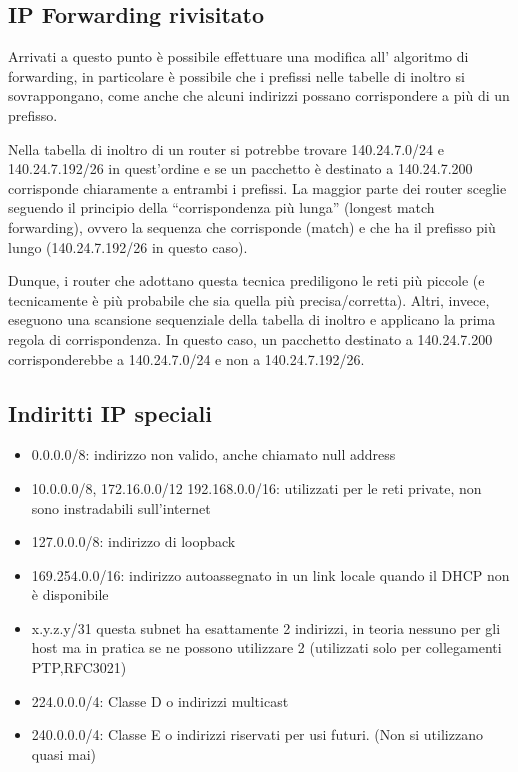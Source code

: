 \subsection{IP Forwarding rivisitato}
Arrivati a questo punto è possibile effettuare una modifica all’ algoritmo di forwarding, in particolare è possibile che i prefissi nelle tabelle di inoltro si sovrappongano, come anche che alcuni indirizzi possano corrispondere a più di un prefisso.
\begin{example}
  Nella tabella di inoltro di un router si potrebbe trovare 140.24.7.0/24 e 140.24.7.192/26 in quest’ordine e se un pacchetto è destinato a 140.24.7.200 corrisponde chiaramente a entrambi i prefissi. La maggior parte dei router sceglie seguendo il principio della “corrispondenza più lunga” (longest match forwarding), ovvero la sequenza che corrisponde (match) e che ha il prefisso più lungo (140.24.7.192/26 in questo caso).
\end{example}
Dunque, i router che adottano questa tecnica prediligono le reti più piccole (e tecnicamente è più probabile che sia quella più precisa/corretta). Altri, invece, eseguono una scansione sequenziale della tabella di inoltro e applicano la prima regola di corrispondenza. In questo caso, un pacchetto destinato a 140.24.7.200 corrisponderebbe a 140.24.7.0/24 e non a 140.24.7.192/26.
\subsection{Indiritti IP speciali}
\begin{itemize}
  \item 0.0.0.0/8: indirizzo non valido, anche chiamato null address
  \item 10.0.0.0/8, 172.16.0.0/12 192.168.0.0/16: utilizzati per le reti private, non sono instradabili sull'internet
  \item 127.0.0.0/8: indirizzo di loopback
  \item 169.254.0.0/16: indirizzo autoassegnato in un link locale quando il DHCP non è disponibile
  \item x.y.z.y/31 questa subnet ha esattamente 2 indirizzi, in teoria nessuno per gli host ma in pratica se ne possono utilizzare 2 (utilizzati solo per collegamenti PTP,RFC3021)
  \item 224.0.0.0/4: Classe D o indirizzi multicast
  \item 240.0.0.0/4: Classe E o indirizzi riservati per usi futuri. (Non si utilizzano quasi mai)
\end{itemize}
